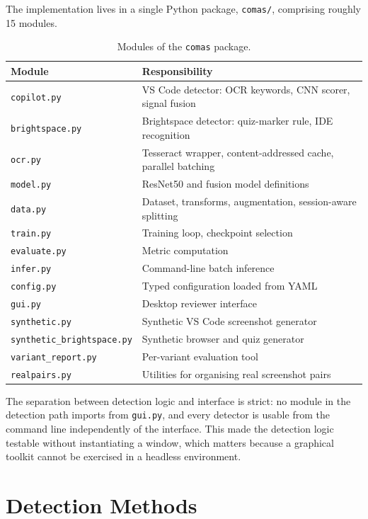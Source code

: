 \documentclass[12pt,oneside]{report}
\newcommand{\code}[1]{\texttt{\small #1}}
\begin{document}
The implementation lives in a single Python package, \code{comas/}, comprising
roughly 15 modules.

\begin{table}[h]
\centering
\caption{Modules of the \code{comas} package.}
\begin{tabular}{@{}p{}p{}@{}}
\toprule
\textbf{Module} & \textbf{Responsibility} \\
\midrule
\code{copilot.py} & VS Code detector: OCR keywords, CNN scorer, signal fusion \\
\code{brightspace.py} & Brightspace detector: quiz-marker rule, IDE recognition \\
\code{ocr.py} & Tesseract wrapper, content-addressed cache, parallel batching \\
\code{model.py} & ResNet50 and fusion model definitions \\
\code{data.py} & Dataset, transforms, augmentation, session-aware splitting \\
\code{train.py} & Training loop, checkpoint selection \\
\code{evaluate.py} & Metric computation \\
\code{infer.py} & Command-line batch inference \\
\code{config.py} & Typed configuration loaded from YAML \\
\code{gui.py} & Desktop reviewer interface \\
\code{synthetic.py} & Synthetic VS Code screenshot generator \\
\code{synthetic\_brightspace.py} & Synthetic browser and quiz generator \\
\code{variant\_report.py} & Per-variant evaluation tool \\
\code{realpairs.py} & Utilities for organising real screenshot pairs \\
\bottomrule
\end{tabular}
\end{table}

The separation between detection logic and interface is strict: no module in
the detection path imports from \code{gui.py}, and every detector is usable
from the command line independently of the interface. This made the detection
logic testable without instantiating a window, which matters because a
graphical toolkit cannot be exercised in a headless environment.

\chapter{Detection Methods}
\label{ch:detection}
\end{document}
